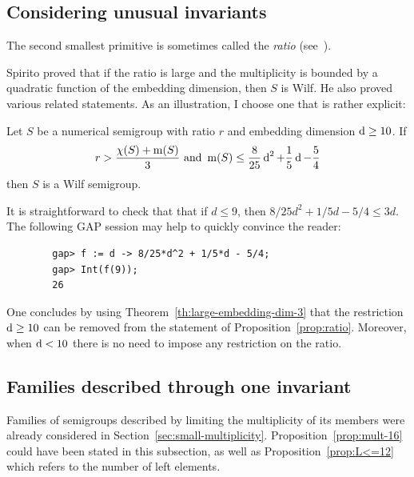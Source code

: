 \subsection{Considering unusual invariants}\label{sec:ratio}

The second smallest primitive is sometimes called the \emph{ratio} (see~\cite[Exercise~2.12]{RosalesGarcia2009Book-Numerical}).

Spirito proved that if the ratio is large and the multiplicity is bounded by a quadratic function of the embedding dimension, then $S$ is Wilf. He also proved various related statements. As an illustration, I choose one that is rather explicit:

\begin{proposition}\label{prop:ratio}
	Let $S$ be a numerical semigroup with ratio $r$ and embedding dimension $\operatorname{d} \ge 10$. If
	\begin{equation}\label{eq:prop-ratio}
	r> \frac{\operatorname{\chi}(S)+\operatorname{m}(S)}{3} \text{ and } \operatorname{m}(S)\le \frac{8}{25}\operatorname{d}^2+\frac{1}{5}\operatorname{d}-\frac{5}{4}
	\end{equation}
	then $S$ is a Wilf semigroup.
\end{proposition}
\begin{remark}
	It is straightforward to check that that if $d\le 9$, then $8/25d^2 + 1/5d - 5/4\le 3d$. The following \textsf{GAP} session may help to quickly convince the reader:
	\begin{verbatim}
		gap> f := d -> 8/25*d^2 + 1/5*d - 5/4;
		gap> Int(f(9));
		26
	\end{verbatim} 
	One concludes by using Theorem~\ref{th:large-embedding-dim-3} that the restriction $\operatorname{d} \ge 10$ can be removed from the statement of Proposition~\ref{prop:ratio}.	Moreover, when $\operatorname{d} < 10$ there is no need to impose any restriction on the ratio.
\end{remark}

\subsection{Families described through one invariant}
Families of semigroups described by limiting the multiplicity of its members were already considered in Section~\ref{sec:small-multiplicity}. Proposition~\ref{prop:mult-16} could have been stated in this subsection, as well as Proposition~\ref{prop:L<=12} which refers to the number of left elements.

